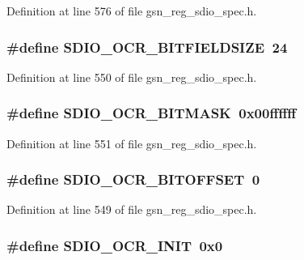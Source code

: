 Definition at line 576 of file gsn\_\-reg\_\-sdio\_\-spec.h.

\hypertarget{a00571_a2ef8d744dcd037de9518ae7bb21c95d7}{
\subsubsection[{SDIO\_\-OCR\_\-BITFIELDSIZE}]{\setlength{\rightskip}{0pt plus 5cm}\#define SDIO\_\-OCR\_\-BITFIELDSIZE~24}}
\label{a00571_a2ef8d744dcd037de9518ae7bb21c95d7}


Definition at line 550 of file gsn\_\-reg\_\-sdio\_\-spec.h.

\hypertarget{a00571_aad3ea1df3a10c401dcc96eaba7bfdb50}{
\subsubsection[{SDIO\_\-OCR\_\-BITMASK}]{\setlength{\rightskip}{0pt plus 5cm}\#define SDIO\_\-OCR\_\-BITMASK~0x00ffffff}}
\label{a00571_aad3ea1df3a10c401dcc96eaba7bfdb50}


Definition at line 551 of file gsn\_\-reg\_\-sdio\_\-spec.h.

\hypertarget{a00571_ab96c901f41a759cc8e1d2a5e24a80485}{
\subsubsection[{SDIO\_\-OCR\_\-BITOFFSET}]{\setlength{\rightskip}{0pt plus 5cm}\#define SDIO\_\-OCR\_\-BITOFFSET~0}}
\label{a00571_ab96c901f41a759cc8e1d2a5e24a80485}


Definition at line 549 of file gsn\_\-reg\_\-sdio\_\-spec.h.

\hypertarget{a00571_a932b8cf13b0312b2062fd78475421658}{
\subsubsection[{SDIO\_\-OCR\_\-INIT}]{\setlength{\rightskip}{0pt plus 5cm}\#define SDIO\_\-OCR\_\-INIT~0x0}}
\label{a00571_a932b8cf13b0312b2062fd78475421658}


